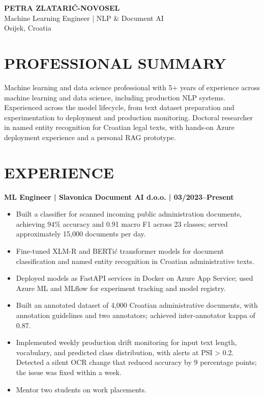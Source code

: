 \documentclass[11pt,a4paper]{article}
\begin{document}
\begin{center}
{\Huge\bfseries\color{primarycolor} PETRA ZLATARIĆ-NOVOSEL}\\[0.4em]
{\large\color{accentcolor} Machine Learning Engineer | NLP \& Document AI}\\[0.2em]
Osijek, Croatia
\end{center}

\section*{PROFESSIONAL SUMMARY}
Machine learning and data science professional with 5+ years of experience across machine learning and data science, including production NLP systems. Experienced across the model lifecycle, from text dataset preparation and experimentation to deployment and production monitoring. Doctoral researcher in named entity recognition for Croatian legal texts, with hands-on Azure deployment experience and a personal RAG prototype.

\section*{EXPERIENCE}
\textbf{ML Engineer | Slavonica Document AI d.o.o. | 03/2023--Present}
\begin{itemize}
\item Built a classifier for scanned incoming public administration documents, achieving 94\% accuracy and 0.91 macro F1 across 23 classes; served approximately 15,000 documents per day.
\item Fine-tuned XLM-R and BERTić transformer models for document classification and named entity recognition in Croatian administrative texts.
\item Deployed models as FastAPI services in Docker on Azure App Service; used Azure ML and MLflow for experiment tracking and model registry.
\item Built an annotated dataset of 4,000 Croatian administrative documents, with annotation guidelines and two annotators; achieved inter-annotator kappa of 0.87.
\item Implemented weekly production drift monitoring for input text length, vocabulary, and predicted class distribution, with alerts at PSI > 0.2. Detected a silent OCR change that reduced accuracy by 9 percentage points; the issue was fixed within a week.
\item Mentor two students on work placements.
\end{itemize}
\end{document}
